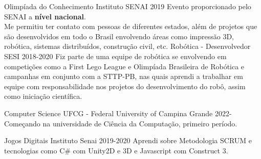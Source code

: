\documentclass[11pt]{spidercv}
\begin{document}




\begin{MainPart}

    \Experience
    {\ColorHighlight}
    {Olimpíada do Conhecimento}
    {Instituto SENAI}
    {2019}
    {
        Evento proporcionado pelo SENAI a \textbf{nível nacional}.\\
        Me permitiu ter
        contato com pessoas de diferentes estados, além de projetos que são desenvolvidos em todo
        o Brasil envolvendo áreas como impressão 3D, robótica, sistemas
        distribuídos, construção civil, etc.
    }
    \Experience
    {\ColorHighlight}
    {Robótica - Desenvolvedor}
    {SESI}
    {2018-2020}
    {
        Fiz parte de uma equipe de robótica se envolvendo em competições
        como a First Lego League e Olimpíada
        Brasileira de Robótica e campanhas em conjunto com a STTP-PB, nas
        quais aprendi a trabalhar em equipe com responsabilidade nos
        projetos do desenvolvimento do robô, assim como iniciação científica.
    }




    \Experience
    {\ColorHighlight}
    {Computer Science}
    {UFCG - Federal University of Campina Grande}
    {2022-\faUndo}
    {
        Começando na universidade de Ciência da Computação, primeiro período.
    }

    \Experience
    {\ColorHighlight}
    {Jogos Digitais}
    {Instituto Senai}
    {2019-2020}
    {
        Aprendi sobre Metodologia SCRUM e tecnologias como C\# com Unity2D e
        3D e Javascript com Construct 3.
    }

        



\end{MainPart}
\end{document}
